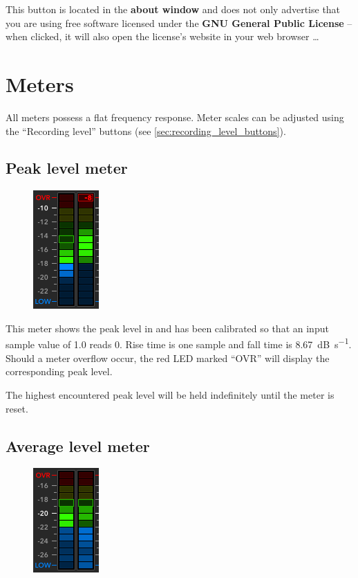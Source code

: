 This button is located in the \textbf{about window} and does not only
advertise that you are using free software licensed under the
\textbf{GNU General Public License} -- when clicked, it will also open
the license's website in your web browser \dots

\chapter{Meters}
\label{chap:meters}

All meters possess a flat frequency response.  Meter scales can be
adjusted using the ``Recording level'' buttons (see
\ref{sec:recording_level_buttons}).

\section{Peak level meter}

\begin{figure}
  \includegraphics[scale=\screenshotscale,clip]{include/images/level_meter_peak.png}
\end{figure}

This meter shows the peak level in \si{\dBFS} and has been calibrated
so that an input sample value of \num{1.0} reads \SI{0}{\dBFS}.  Rise
time is one sample and fall time is \SI{8.67}{\dB\per\second}.  Should
a meter overflow occur, the red LED marked ``OVR'' will display the
corresponding peak level.

The highest encountered peak level will be held indefinitely until the
meter is reset.

\newpage %

\section{Average level meter}

\begin{figure}
  \includegraphics[scale=\screenshotscale,clip]{include/images/level_meter_average.png}
\end{figure}

